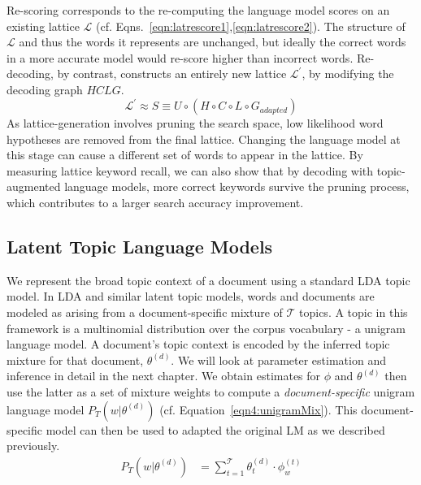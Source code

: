 Re-scoring corresponds to the re-computing the language model scores on an existing lattice $\mathcal{L}$ (cf. Eqns.~\ref{eqn:latrescore1},\ref{eqn:latrescore2}).  
The structure of $\mathcal{L}$ and thus the words it represents are unchanged, but ideally the correct words in a more accurate model would re-score higher than incorrect words.  Re-decoding, by contrast, constructs an entirely new lattice $\mathcal{L}^{\prime}$, by modifying the decoding graph $HCLG$.
\begin{equation}
\mathcal{L}^{\prime} \approx S \equiv U \circ (H\circ C\circ L\circ G_{adapted})
\end{equation}
As lattice-generation involves pruning the search space, low likelihood word hypotheses are removed from the final lattice. Changing the language model at this stage can cause a different set of words to appear in the lattice.  By measuring lattice keyword recall, we can also show that by decoding with topic-augmented language models, more correct keywords survive the pruning process, which contributes to a larger search accuracy improvement.


\subsection{Latent Topic Language Models}
\label{sec:ltlm}
We represent the broad topic context of a document using a standard LDA topic model. In LDA and similar latent topic models, words and documents are modeled as arising from a document-specific mixture of $\mathcal{T}$ topics.  A topic in this framework is a multinomial distribution over the corpus vocabulary - a unigram language model.  A document's topic context is encoded by the inferred topic mixture for that document, $\theta^{(d)}$.  We will look at parameter estimation and inference in detail in the next chapter.  We obtain estimates for $\phi$ and $\theta^{(d)}$ then use the latter as a set of mixture weights to compute a \textit{document-specific} unigram language model $P_{T}(w|\theta^{(d)})$ (cf. Equation~\ref{eqn4:unigramMix}).  This document-specific model can then be used to adapted the original LM as we described previously.
\begin{align}
P_T(w|\theta^{(d)}) &= \sum_{t=1}^{\mathcal{T}} {\theta^{(d)}_t\cdot \phi^{(t)}_w} \label{eqn4:unigramMix} 
\end{align}

